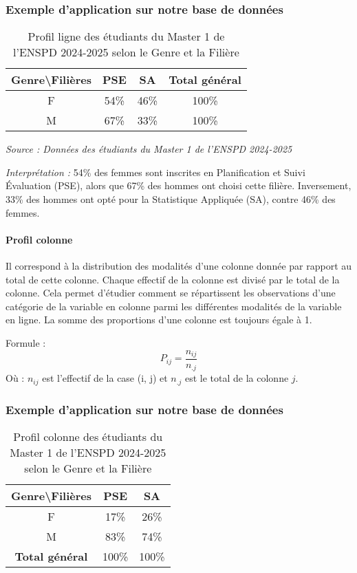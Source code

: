 \documentclass[a4paper,12pt]{article}
\begin{document}
\subsubsection*{Exemple d’application sur notre base de données}
\begin{table}[h!]
\centering
\caption{Profil ligne des étudiants du Master 1 de l’ENSPD 2024-2025 selon le Genre et la Filière}
\begin{tabular}{|c|c|c|c|}
\hline
\textbf{Genre\textbackslash Filières} & \textbf{PSE} & \textbf{SA} & \textbf{Total général} \\
\hline
F & 54\% & 46\% & 100\% \\
M & 67\% & 33\% & 100\% \\
\hline
\end{tabular}
\end{table}

\textit{Source : Données des étudiants du Master 1 de l’ENSPD 2024-2025}

\textit{Interprétation :} 54\% des femmes sont inscrites en Planification et Suivi Évaluation (PSE), alors que 67\% des hommes ont choisi cette filière. Inversement, 33\% des hommes ont opté pour la Statistique Appliquée (SA), contre 46\% des femmes.

\paragraph{Profil colonne}
Il correspond à la distribution des modalités d'une colonne donnée par rapport au total de cette colonne. Chaque effectif de la colonne est divisé par le total de la colonne. Cela permet d’étudier comment se répartissent les observations d’une catégorie de la variable en colonne parmi les différentes modalités de la variable en ligne. La somme des proportions d'une colonne est toujours égale à 1.

Formule :
\[
P_{ij} = \frac{n_{ij}}{n_{.j}}
\]
Où : \( n_{ij} \) est l’effectif de la case (i, j) et \( n_{.j} \) est le total de la colonne \( j \).

\subsubsection*{Exemple d’application sur notre base de données}
\begin{table}[h!]
\centering
\caption{Profil colonne des étudiants du Master 1 de l’ENSPD 2024-2025 selon le Genre et la Filière}
\begin{tabular}{|c|c|c|}
\hline
\textbf{Genre\textbackslash Filières} & \textbf{PSE} & \textbf{SA} \\
\hline
F & 17\% & 26\% \\
M & 83\% & 74\% \\
\hline
\textbf{Total général} & 100\% & 100\% \\
\hline
\end{tabular}
\end{table}
\end{document}
